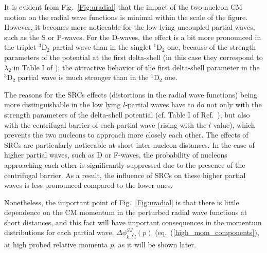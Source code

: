 \documentclass[aps,twocolumn,showpacs,preprintnumbers,amsmath,amssymb,nofootinbib,superscriptaddress,showkeys,noeprint]{revtex4-1}
\begin{document}
It is evident from Fig.~\ref{Fig:uradial} that the impact of the
two-nucleon CM motion on the radial wave functions is minimal within
the scale of the figure. However, it becomes more noticeable for the
low-lying uncoupled partial waves, such as the S or P-waves.  For the
D-waves, the effect is a bit more pronounced in the triplet
${}^{3}$D$_2$ partial wave than in the singlet ${}^{1}$D$_2$ one,
because of the strength parameters of the potential at the first
delta-shell (in this case they correspond to $\lambda_2$ in Table I of
\cite{Perez:2013mwa}); the attractive behavior of the first
delta-shell parameter in the ${}^{3}$D$_2$ partial wave is much
stronger than in the ${}^{1}$D$_2$ one.

The reasons for the SRCs effects (distortions in the radial wave
functions) being more distinguishable in the low lying $l$-partial
waves have to do not only with the strength parameters of the
delta-shell potential (cf. Table I of Ref.~\cite{Perez:2013mwa}), but
also with the centrifugal barrier of each partial wave (rising with
the $l$ value), which prevents the two nucleons to approach more
closely each other. The effects of SRCs are particularly noticeable at
short inter-nucleon distances. In the case of higher partial waves,
such as D or F-waves, the probability of nucleons approaching each
other is significantly suppressed due to the presence of the
centrifugal barrier. As a result, the influence of SRCs on these
higher partial waves is less pronounced compared to the lower ones.

Nonetheless, the important point of Fig.~\ref{Fig:uradial} is that
there is little dependence on the CM momentum in the perturbed radial
wave functions at short distances, and this fact will have important
consequences in the momentum distributions for each partial wave,
$\Delta\phi^{SJ}_{k,l^\prime l}(p)$ (eq.~(\ref{high_mom_components}),
at high probed relative momenta $p$, as it will be shown later.
\end{document}
